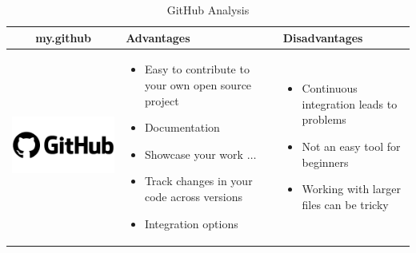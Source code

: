 \documentclass{article}
\begin{document}
\begin{table}[h!]
	\centering
	\begin{tabular}{ | c | m{5cm} | m{5cm} | }
			\hline
			my.github & Advantages & Disadvantages \\ \hline 
			\begin{minipage}{.4\textwidth}
				\includegraphics[width=\linewidth, height=40mm]{github}
			\end{minipage}	
		    &
		     \begin{itemize}
		        \item Easy to contribute to your own open source project
                \item Documentation
                \item Showcase your work $\ldots$
                \item Track changes in your code across versions
                \item Integration options
		     \end{itemize}
		    &
		     \begin{itemize}
		        \item Continuous integration leads to problems
		        \item Not an easy tool for beginners
		        \item Working with larger files can be tricky
	         \end{itemize}
		    \\ \hline
	\end{tabular}	
    \caption{GitHub Analysis}\label{tbl:mygitHub}
\end{table}        
\end{document}
